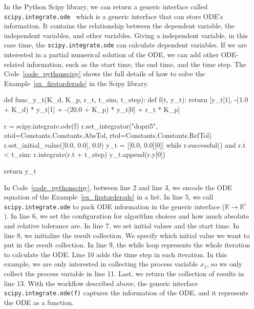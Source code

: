 In the Python Scipy library, we can return a generic interface called \verb|scipy.integrate.ode|~\citep{scipyfun} which is a generic interface that can store ODE's information. It contains the relationship between the dependent variable, the independent variables, and other variables. Giving a independent variable, in this case time, the \verb|scipy.integrate.ode| can calculate dependent variables. If we are interested in a partial numerical solution of the ODE, we can add other ODE-related information, such as the start time, the end time, and the time step. The Code~\ref{code_pythonscipy} shows the full details of how to solve the Example~\ref{ex_firstorderode} in the Scipy library.

\begin{listing}[ht]
\begin{python1}
def func_y_t(K_d, K_p, r_t, t_sim, t_step):
    def f(t, y_t):
        return [y_t[1], -(1.0 + K_d) * y_t[1] + -(20.0 + K_p) * y_t[0] + r_t * K_p]
    
    r = scipy.integrate.ode(f)
    r.set_integrator("dopri5", atol=Constants.Constants.AbsTol, rtol=Constants.Constants.RelTol)
    r.set_initial_value([0.0, 0.0], 0.0)
    y_t = [[0.0, 0.0][0]]
    while r.successful() and r.t < t_sim:
        r.integrate(r.t + t_step)
        y_t.append(r.y[0])
    
    return y_t
\end{python1}
\label{code_pythonscipy}
\end{listing}

In Code~\ref{code_pythonscipy}, between line 2 and line 3, we encode the ODE equation of the Example~\ref{ex_firstorderode} in a list. In line 5, we call \verb|scipy.integrate.ode| to pack ODE information in the generic interface ($\mathbb{R} \rightarrow \mathbb{R}^i$). In line 6, we set the configuration for algorithm choices and how much absolute and relative tolerance are. In line 7, we set initial values and the start time. In line 8, we initialize the result collection. We specify which initial value we want to put in the result collection. In line 9, the while loop represents the whole iteration to calculate the ODE.  Line 10 adds the time step in each iteration. In this example, we are only interested in collecting the process variable $x_1$, so we only collect the process variable in line 11. Last, we return the collection of results in line 13. With the workflow described above, the generic interface \verb|scipy.integrate.ode(f)| captures the information of the ODE, and it represents the ODE as a function.

